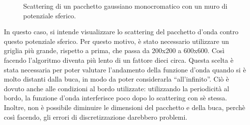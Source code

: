 \begin{figure}[hp]
 \centering
 \caption{Scattering di un pacchetto gaussiano monocromatico con un muro di potenziale sferico.} 
 \end{figure}
 In questo caso, si intende visualizzare lo scattering del pacchetto d'onda contro questo potenziale sferico.
Per questo motivo, è stato necessario utilizzare un griglia più grande, rispetto a prima,
che passa da 200x200 a 600x600. Così facendo l'algoritmo diventa più lento di un fattore dieci circa.
Questa scelta è stata necessaria per poter
valutare l'andamento della funzione d'onda quando si è molto distanti dalla buca, in modo da poter considerarla ``all'infinito''. 
Ciò è dovuto anche alle condizioni al bordo utilizzate: utilizzando la periodicità al bordo, la funzione d'onda interferisce poco dopo lo scattering
con sè stessa. Inoltre, non è possibile diminuire le dimensioni del pacchetto e della buca, perchè così facendo,
gli errori di discretizzazione darebbero problemi.
